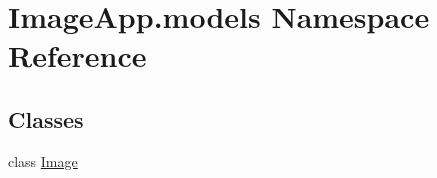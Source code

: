 \hypertarget{namespace_image_app_1_1models}{}\section{Image\+App.\+models Namespace Reference}
\label{namespace_image_app_1_1models}
\subsection*{Classes}
\begin{DoxyCompactItemize}
\item 
class \mbox{\hyperlink{class_image_app_1_1models_1_1_image}{Image}}
\end{DoxyCompactItemize}
